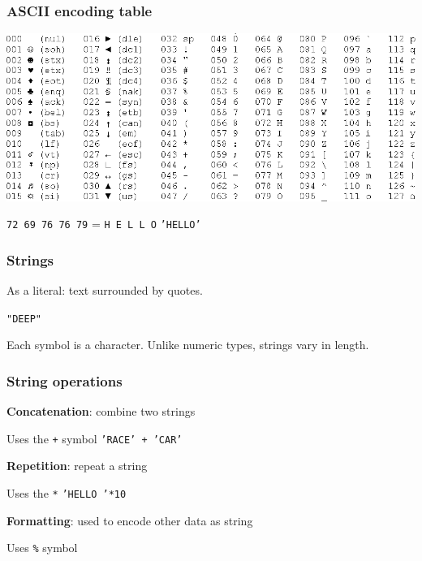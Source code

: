 \documentclass[11pt]{beamer}
\begin{document}
\begin{frame}
  \frametitle{ASCII encoding table}
  \Enlarge
  \includegraphics[width=\textwidth]{./img/ascii-table.png}

  \texttt{72 69 76 76 79} = \texttt{H E L L O}
  \texttt{'HELLO'}
\end{frame}

\begin{frame}
  \frametitle{Strings}
  \Enlarge

  \begin{itemize}
  \myitem  As a literal:  text surrounded by quotes.
    \begin{itemize}
    \mysubitem  \texttt{"DEEP"}
    \end{itemize}
  \myitem  Each symbol is a character.
  \myitem  Unlike numeric types, strings vary in length.
  \end{itemize}
\end{frame}

\begin{frame}
  \frametitle{String operations}
  \Enlarge

  \begin{itemize}
  \myitem  \textbf{Concatenation}:  combine two strings
    \begin{itemize}
    \mysubitem  Uses the \texttt{+} symbol
    \mysubitem  \texttt{'RACE' + 'CAR'}
    \end{itemize}
  \myitem  \textbf{Repetition}:  repeat a string
    \begin{itemize}
    \mysubitem  Uses the \texttt{*}
    \mysubitem  \texttt{'HELLO '*10}
    \end{itemize}
  \myitem  \textbf{Formatting}:  used to encode other data as string
    \begin{itemize}
    \mysubitem  Uses \texttt{\%} symbol
    \end{itemize}
  \end{itemize}
\end{frame}
\end{document}
